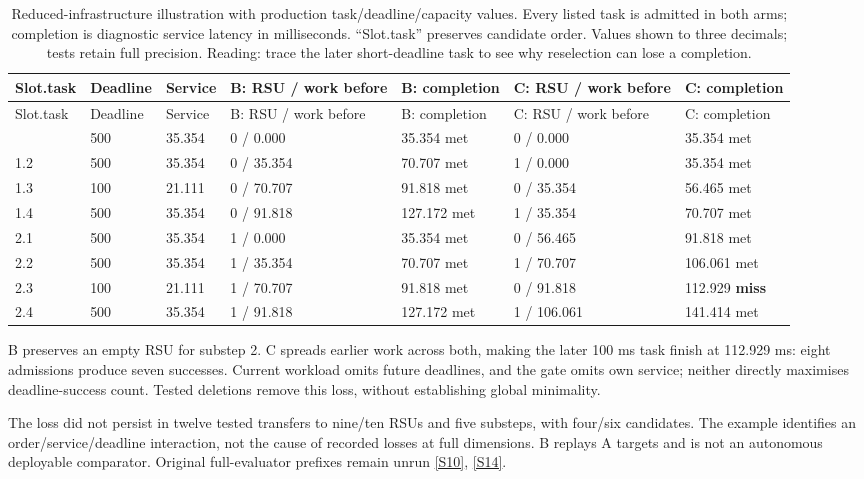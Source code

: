 \documentclass[12pt,a4paper]{article}
\begin{document}
\begingroup
\singlespacing\footnotesize\setlength{\tabcolsep}{3pt}
\renewcommand{\thetable}{C1}
\begin{xltabular}{\textwidth}{@{}YYYYYYY@{}}
\caption[Adverse dispatch illustration]{Reduced-infrastructure illustration with production task/deadline/capacity values. Every listed task is admitted in both arms; completion is diagnostic service latency in milliseconds. ``Slot.task'' preserves candidate order. Values shown to three decimals; tests retain full precision. Reading: trace the later short-deadline task to see why reselection can lose a completion.}\label{tab:C1} \\
\toprule
Slot.task & Deadline & Service & B: RSU / work before & B: completion & C: RSU / work before & C: completion \\
\midrule\endfirsthead
\toprule
Slot.task & Deadline & Service & B: RSU / work before & B: completion & C: RSU / work before & C: completion \\
\midrule\endhead
\bottomrule{} & 500 & 35.354 & 0 / 0.000 & 35.354 met & 0 / 0.000 & 35.354 met \\
1.2 & 500 & 35.354 & 0 / 35.354 & 70.707 met & 1 / 0.000 & 35.354 met \\
1.3 & 100 & 21.111 & 0 / 70.707 & 91.818 met & 0 / 35.354 & 56.465 met \\
1.4 & 500 & 35.354 & 0 / 91.818 & 127.172 met & 1 / 35.354 & 70.707 met \\
2.1 & 500 & 35.354 & 1 / 0.000 & 35.354 met & 0 / 56.465 & 91.818 met \\
2.2 & 500 & 35.354 & 1 / 35.354 & 70.707 met & 1 / 70.707 & 106.061 met \\
2.3 & 100 & 21.111 & 1 / 70.707 & 91.818 met & 0 / 91.818 & 112.929 \textbf{miss} \\
2.4 & 500 & 35.354 & 1 / 91.818 & 127.172 met & 1 / 106.061 & 141.414 met \\
\end{xltabular}
\endgroup

B preserves an empty RSU for substep 2. C spreads earlier work across both, making the later 100 ms task finish at 112.929 ms: eight admissions produce seven successes. Current workload omits future deadlines, and the gate omits own service; neither directly maximises deadline-success count. Tested deletions remove this loss, without establishing global minimality.

The loss did not persist in twelve tested transfers to nine/ten RSUs and five substeps, with four/six candidates. The example identifies an order/service/deadline interaction, not the cause of recorded losses at full dimensions. B replays A targets and is not an autonomous deployable comparator. Original full-evaluator prefixes remain unrun \hyperref[source-s10]{[S10]}, \hyperref[source-s14]{[S14]}.
\end{document}
